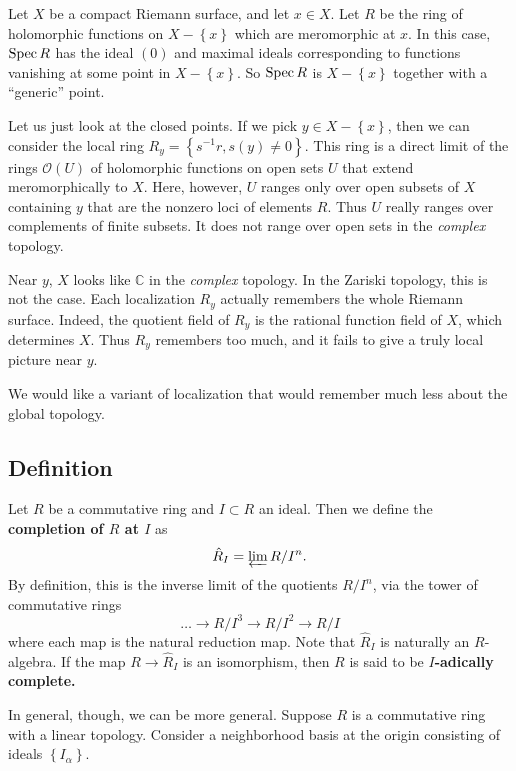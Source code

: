 \begin{example} 
Let $X$ be a compact Riemann surface, and let $x \in X$. Let $R$ be the ring of
holomorphic functions on $X - \left\{x\right\}$ which are meromorphic at $x$.
In this case, $\operatorname{Spec} R$ has the ideal $(0)$ and maximal ideals corresponding
to functions vanishing at some point in $X - \left\{x\right\}$. So $\operatorname{Spec} R$ is $X -
\left\{x\right\}$ together with a ``generic'' point.

Let us just look at the closed points.  If we pick $y \in X - \left\{x\right\}$,
then we can consider the local ring $R_y = \left\{s^{-1}r, s(y) \neq
0\right\}$. This ring is a direct limit of the rings $\mathcal{O}(U)$ of holomorphic functions
on open sets $U$ that extend meromorphically to $X$. Here, however, $U$ ranges
only over open
subsets of $X$ containing $y$ that  are the nonzero loci of elements $R$. Thus $U$ really ranges over complements of
finite subsets. It does not range over open sets in the \emph{complex} topology.

Near $y$, $X$ looks like $\mathbb{C}$ in the \emph{complex} topology. In the Zariski topology, this
is not the case. Each localization $R_y$ actually remembers the whole Riemann
surface. Indeed, the  quotient field of $R_y$ is the rational function field of
$X$, which determines  $X$. Thus $R_y$ remembers too much, and it fails to
give a truly local picture near $y$. 
\end{example} 

We would like a variant of localization that would remember much less about the
global topology.

\subsection{Definition}

\begin{definition} \label{defcompletion}
Let $R$ be a commutative ring and $I \subset R$ an ideal. Then we define the
\textbf{completion of $R$ at $I$} as
\[ \hat{R}_I = \varprojlim R/I^n.  \]
By definition, this is the inverse limit of the quotients $R/I^n$, via the tower of
commutative rings
\[ \dots \to  R/I^3 \to R/I^2 \to R/I   \]
where each map is the natural reduction map. Note that $\hat{R}_I$ is
naturally an $R$-algebra. If the map $R \to \hat{R}_I$ is an isomorphism, then
$R$ is said to be \textbf{$I$-adically complete.}
\end{definition} 

In general, though, we can be more general. Suppose $R$ is a commutative ring
with a linear topology. Consider a neighborhood basis at the origin consisting
of ideals
$\left\{I_\alpha\right\}$. 

